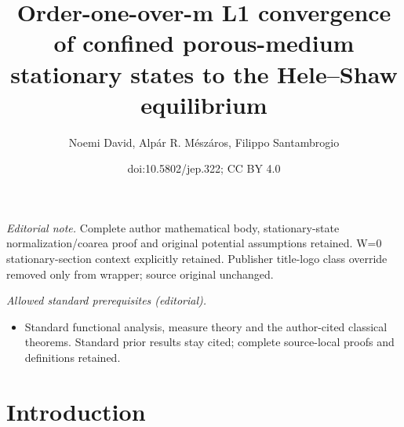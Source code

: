 \documentclass[10pt]{amsart}
\title{Order-one-over-m L1 convergence of confined porous-medium stationary states to the Hele–Shaw equilibrium}
\author{Noemi David, Alpár R. Mészáros, Filippo Santambrogio}
\date{doi:10.5802/jep.322; CC BY 4.0}
\theoremstyle{plain}
\theoremstyle{remark}
\begin{document}
\maketitle
\noindent\textit{Editorial note.} Complete author mathematical body, stationary-state normalization/coarea proof and original potential assumptions retained. W=0 stationary-section context explicitly retained. Publisher title-logo class override removed only from wrapper; source original unchanged.\par\medskip
\noindent\textit{Allowed standard prerequisites (editorial).}\begin{itemize}
\item Standard functional analysis, measure theory and the author-cited classical theorems. Standard prior results stay cited; complete source-local proofs and definitions retained.
\end{itemize}\medskip
\vspace*{-\baselineskip}
\tableofcontents


\section{Introduction}
\end{document}
